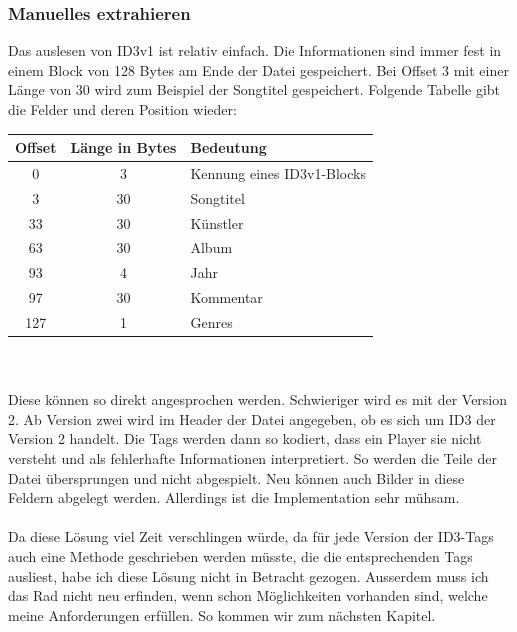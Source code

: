\documentclass[12pt,a4paper,ngerman]{report}
\begin{document}
\subsubsection*{Manuelles extrahieren}
Das auslesen von ID3v1 ist relativ einfach. Die Informationen sind immer fest in einem Block von 128 Bytes am Ende der Datei gespeichert. Bei Offset 3 mit einer Länge von 30 wird zum Beispiel der Songtitel gespeichert. Folgende Tabelle gibt die Felder und deren Position wieder:\\
\begin{tabular}{|c|c|l|} \hline
 \textbf{Offset} & \textbf{Länge in Bytes} & \textbf{Bedeutung}\\
 \hline
 0 & 3 & Kennung eines ID3v1-Blocks\\ \hline
 3 & 30 & Songtitel\\ \hline
 33 & 30 & Künstler\\ \hline
 63 & 30 & Album\\ \hline
 93 & 4 & Jahr\\ \hline
 97 & 30 & Kommentar\\ \hline
 127 & 1 & Genres\\ \hline
\end{tabular} \\ \\
Diese können so direkt angesprochen werden. Schwieriger wird es mit der Version 2. Ab Version zwei wird im Header der Datei angegeben, ob es sich um ID3 der Version 2 handelt. Die Tags werden dann so kodiert, dass ein Player sie nicht versteht und als fehlerhafte Informationen interpretiert. So werden die Teile der Datei übersprungen und nicht abgespielt. Neu können auch Bilder in diese Feldern abgelegt werden. Allerdings ist die Implementation sehr mühsam.
\\
\\
Da diese Lösung viel Zeit verschlingen würde, da für jede Version der ID3-Tags auch eine Methode geschrieben werden müsste, die die entsprechenden Tags ausliest, habe ich diese Lösung nicht in Betracht gezogen. Ausserdem muss ich das Rad nicht neu erfinden, wenn schon Möglichkeiten vorhanden sind, welche meine Anforderungen erfüllen. So kommen wir zum nächsten Kapitel.
\end{document}
